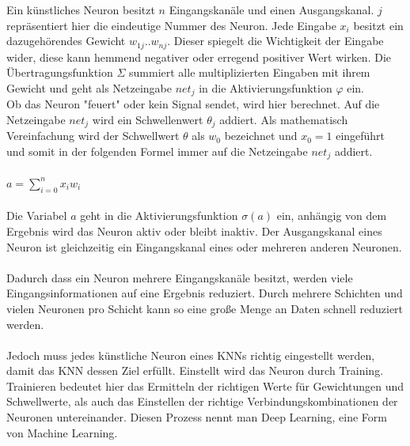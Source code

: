 \documentclass[12pt,oneside,a4paper,parskip]{scrbook}
\begin{document}
Ein künstliches Neuron besitzt $n$ Eingangskanäle und einen Ausgangskanal. $j$ repräsentiert hier die eindeutige Nummer des Neuron. Jede Eingabe $x_{i}$ besitzt ein dazugehörendes Gewicht $w_{1j}..w_{nj}$. Dieser spiegelt die Wichtigkeit der Eingabe wider, diese kann hemmend negativer oder erregend positiver Wert wirken. Die Übertragungsfunktion $\Sigma$ summiert alle multiplizierten Eingaben mit ihrem Gewicht und geht als Netzeingabe $net_j$ in die Aktivierungsfunktion $\varphi$ ein. \\
Ob das Neuron "feuert" oder kein Signal sendet, wird hier berechnet. Auf die Netzeingabe $net_j$ wird ein Schwellenwert $\theta_j$ addiert. Als mathematisch Vereinfachung wird der Schwellwert $\theta$ als $w_0$ bezeichnet und $x_0 = 1$ eingeführt und somit in der folgenden Formel immer auf die Netzeingabe $net_j$ addiert.
\\\\
${\displaystyle a=\sum _{i=0}^{n}x_{i}w_{i}}$
\\\\
Die Variabel $a$ geht in die Aktivierungsfunktion ${\sigma (a)}$ ein, anhängig von dem Ergebnis wird das Neuron aktiv oder bleibt inaktiv.
Der Ausgangskanal eines Neuron ist gleichzeitig ein Eingangskanal eines oder mehreren anderen Neuronen.
\\\\
Dadurch dass ein Neuron mehrere Eingangskanäle besitzt, werden viele Eingangsinformationen auf eine Ergebnis reduziert. Durch mehrere Schichten und vielen Neuronen pro Schicht kann so eine große Menge an Daten schnell reduziert werden.
\\\\
Jedoch muss jedes künstliche Neuron eines KNNs richtig eingestellt werden, damit das KNN dessen Ziel erfüllt. Einstellt wird das Neuron durch Training. Trainieren bedeutet hier das Ermitteln der richtigen Werte für Gewichtungen und Schwellwerte, als auch das Einstellen der richtige Verbindungskombinationen der Neuronen untereinander. Diesen Prozess nennt man Deep Learning, eine Form von Machine Learning.
\end{document}
